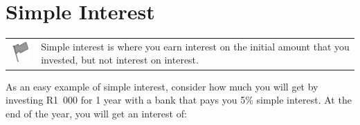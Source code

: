             \section{ Simple Interest}
            \nopagebreak
\par
            \label{m39332*fhsst!!!underscore!!!id906}\begin{definition}
	  \begin{tabular*}{15 cm}{m{15 mm}m{}}
	\hspace*{-50pt}  \includegraphics[width=0.5in]{col11306.imgs/psflag2.png}   & \Definition{   \label{id2476740}\textbf{ Simple Interest }} { \label{m39332*meaningfhsst!!!underscore!!!id906}
      \label{m39332*id69230}Simple interest is where you earn interest on the initial amount that you invested, but not interest on interest. \par 
       } 
      \end{tabular*}
      \end{definition}
      \label{m39332*id69242}As an easy example of simple interest, consider how much you will get by investing R1~000 for 1 year with a bank that pays you 5\% simple interest. At the end of the year, you will get an interest of:\par 
      \label{m39332*id69248}\nopagebreak\noindent{}
